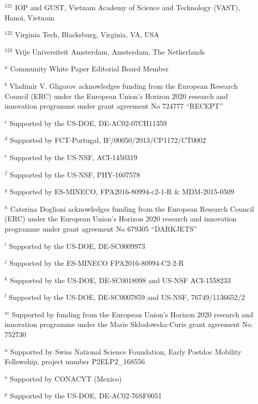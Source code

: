 \par {\footnotesize $^{121}$ IOP and GUST, Vietnam Academy of Science and Technology (VAST), Hanoi, Vietnam}
\par {\footnotesize $^{122}$ Virginia Tech, Blacksburg, Virginia, VA, USA}
\par {\footnotesize $^{123}$ Vrije Universiteit Amsterdam, Amsterdam, The Netherlands}
\bigskip
\par {\footnotesize $^{a}$ Community White Paper Editorial Board Member}
\par {\footnotesize $^{b}$ Vladimir V. Gligorov acknowledges funding from the European Research Council (ERC) under the European Union's Horizon 2020 research and innovation programme under grant agreement No 724777 “RECEPT”}
\par {\footnotesize $^{c}$ Supported by the US-DOE, DE-AC02-07CH11359}
\par {\footnotesize $^{d}$ Supported by FCT-Portugal, IF/00050/2013/CP1172/CT0002}
\par {\footnotesize $^{e}$ Supported by the US-NSF, ACI-1450319}
\par {\footnotesize $^{f}$ Supported by the US-NSF, PHY-1607578}
\par {\footnotesize $^{g}$ Supported by ES-MINECO, FPA2016-80994-c2-1-R \& MDM-2015-0509}
\par {\footnotesize $^{h}$ Caterina Doglioni acknowledges funding from the European Research Council (ERC) under the European Union's Horizon 2020 research and innovation programme under grant agreement No 679305 “DARKJETS”}
\par {\footnotesize $^{i}$ Supported by the US-DOE, DE-SC0009973}
\par {\footnotesize $^{j}$ Supported by the ES-MINECO FPA2016-80994-C2-2-R}
\par {\footnotesize $^{k}$ Supported by the US-DOE, DE-SC0018098 and US-NSF ACI-1558233}
\par {\footnotesize $^{l}$ Supported by the US-DOE, DE-SC0007859 and US-NSF, 76749/1136652/2}
\par {\footnotesize $^{m}$ Supported by funding from the European Union’s Horizon 2020 research and innovation programme under the Marie Skłodowska-Curie grant agreement No. 752730}
\par {\footnotesize $^{n}$ Supported by Swiss National Science Foundation, Early Postdoc Mobility Fellowship, project number P2ELP2\_168556}
\par {\footnotesize $^{o}$ Supported by CONACYT (Mexico)}
\par {\footnotesize $^{p}$ Supported by the US-DOE, DE-AC02-76SF0051}
